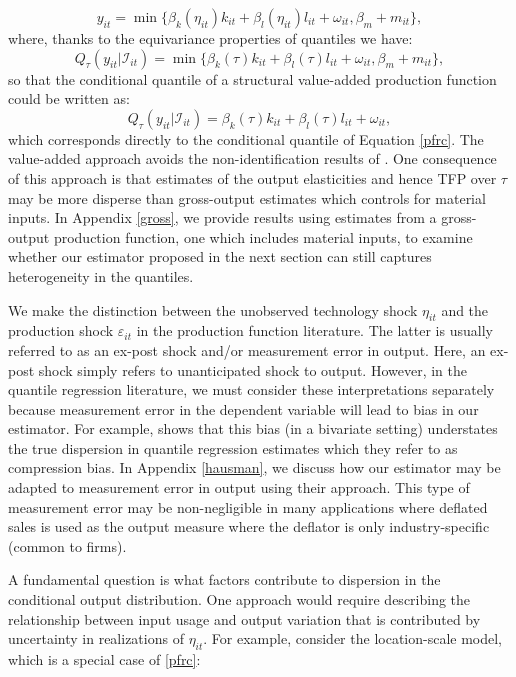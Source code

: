 \documentclass[12pt]{article}
\begin{document}
\begin{equation*}
y_{it}=\min\{\beta_{k}(\eta_{it})k_{it}+\beta_{l}(\eta_{it})l_{it}+\omega_{it}, \beta_{m}+m_{it}\},
\end{equation*}
where, thanks to the equivariance properties of quantiles we have:
\begin{equation*} 
Q_{\tau}(y_{it}|\mathcal{I}_{it})=\min\{\beta_{k}(\tau)k_{it}+\beta_{l}(\tau)l_{it}+\omega_{it}, \beta_{m}+m_{it}\},
\end{equation*}
so that the conditional quantile of a structural value-added production function could be written as:
\begin{equation*}
Q_{\tau}(y_{it}|\mathcal{I}_{it})=\beta_{k}(\tau)k_{it}+\beta_{l}(\tau)l_{it}+\omega_{it},
\end{equation*}
which corresponds directly to the conditional quantile of Equation \eqref{pfrc}. The value-added approach avoids the non-identification results of \cite{Gandhi2020}. One consequence of this approach is that estimates of the output elasticities and hence TFP over $\tau$ may be more disperse than gross-output estimates which controls for material inputs. In Appendix \ref{gross}, we provide results using estimates from a gross-output production function, one which includes material inputs, to examine whether our estimator proposed in the next section can still captures heterogeneity in the quantiles.

We make the distinction between the unobserved technology shock $\eta_{it}$ and the production shock $\varepsilon_{it}$ in the production function literature. The latter is usually referred to as an ex-post shock and/or measurement error in output. Here, an ex-post shock simply refers to unanticipated shock to output. However, in the quantile regression literature, we must consider these interpretations separately because measurement error in the dependent variable will lead to bias in our estimator. For example, \cite{Hausman2021} shows that this bias (in a bivariate setting) understates the true dispersion in quantile regression estimates which they refer to as compression bias. In Appendix \ref{hausman}, we discuss how our estimator may be adapted to measurement error in output using their approach. This type of measurement error may be non-negligible in many applications where deflated sales is used as the output measure where the deflator is only industry-specific (common to firms). 

A fundamental question is what factors contribute to dispersion in the conditional output distribution. One approach would require describing the relationship between input usage and output variation that is contributed by uncertainty in realizations of $\eta_{it}$. For example, consider the location-scale model, which is a special case of \eqref{pfrc}:
\end{document}
